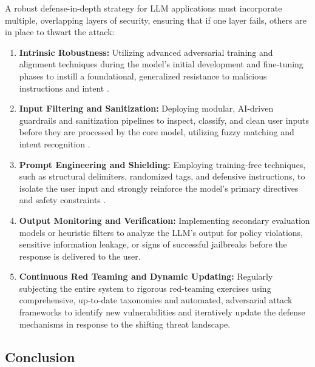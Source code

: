 \documentclass[11pt,a4paper]{article}
\begin{document}
A robust defense-in-depth strategy for LLM applications must incorporate multiple, overlapping layers of security, ensuring that if one layer fails, others are in place to thwart the attack:
\begin{enumerate}
  \item \textbf{Intrinsic Robustness:} Utilizing advanced adversarial training and alignment techniques during the model's initial development and fine-tuning phases to instill a foundational, generalized resistance to malicious instructions and intent \cite{Liu_2025_LLM}.
  \item \textbf{Input Filtering and Sanitization:} Deploying modular, AI-driven guardrails and sanitization pipelines to inspect, classify, and clean user inputs before they are processed by the core model, utilizing fuzzy matching and intent recognition \cite{Shi_2025_Promptarmor}.
  \item \textbf{Prompt Engineering and Shielding:} Employing training-free techniques, such as structural delimiters, randomized tags, and defensive instructions, to isolate the user input and strongly reinforce the model's primary directives and safety constraints \cite{Chen_2024_Defense}.
  \item \textbf{Output Monitoring and Verification:} Implementing secondary evaluation models or heuristic filters to analyze the LLM's output for policy violations, sensitive information leakage, or signs of successful jailbreaks before the response is delivered to the user.
  \item \textbf{Continuous Red Teaming and Dynamic Updating:} Regularly subjecting the entire system to rigorous red-teaming exercises using comprehensive, up-to-date taxonomies \cite{Pathade_2025_LLMs} and automated, adversarial attack frameworks \cite{Hackett_2025_LLM} to identify new vulnerabilities and iteratively update the defense mechanisms in response to the shifting threat landscape.
\end{enumerate}
\subsection{Conclusion}
\end{document}
